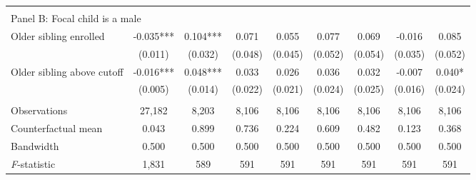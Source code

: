 {{\begin{tabular}{lcccccccc}
&  &  &  & & & & & \\
\multicolumn{10}{l}{Panel B: Focal child is a male} \\
Older sibling enrolled&      -0.035***&       0.104***&       0.071   &       0.055   &       0.077   &       0.069   &      -0.016   &       0.085   \\
                    &     (0.011)   &     (0.032)   &     (0.048)   &     (0.045)   &     (0.052)   &     (0.054)   &     (0.035)   &     (0.052)   \\
 
Older sibling above cutoff&      -0.016***&       0.048***&       0.033   &       0.026   &       0.036   &       0.032   &      -0.007   &       0.040*  \\
                    &     (0.005)   &     (0.014)   &     (0.022)   &     (0.021)   &     (0.024)   &     (0.025)   &     (0.016)   &     (0.024)   \\
                    &               &               &               &               &               &               &               &               \\
Observations        &      27,182   &       8,203   &       8,106   &       8,106   &       8,106   &       8,106   &       8,106   &       8,106   \\
Counterfactual mean &       0.043   &       0.899   &       0.736   &       0.224   &       0.609   &       0.482   &       0.123   &       0.368   \\
Bandwidth           &       0.500   &       0.500   &       0.500   &       0.500   &       0.500   &       0.500   &       0.500   &       0.500   \\
\textit{F}-statistic&       1,831   &         589   &         591   &         591   &         591   &         591   &         591   &         591   \\
 

\bottomrule
\end{tabular}
}
}
